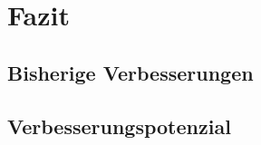 \documentclass{beamer}
\begin{document}
\section{Fazit}
\begin{frame}{}
\begin{center}
\end{center}
\end{frame}

\subsection{Bisherige Verbesserungen}
\begin{frame}{\subsecname}

\end{frame}

\subsection{Verbesserungspotenzial}
\begin{frame}{\subsecname}

\end{frame}
\end{document}
